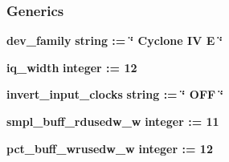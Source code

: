 \subsubsection*{Generics}
 \begin{DoxyCompactItemize}
\item 
{\bf dev\+\_\+family} {\bfseries {\bfseries \textcolor{comment}{string}\textcolor{vhdlchar}{ }\textcolor{vhdlchar}{ }\textcolor{vhdlchar}{\+:}\textcolor{vhdlchar}{=}\textcolor{vhdlchar}{ }\textcolor{vhdlchar}{ }\textcolor{vhdlchar}{ }\textcolor{vhdlchar}{ }\textcolor{keyword}{\char`\"{} Cyclone I\+V E \char`\"{}}\textcolor{vhdlchar}{ }}}
\item 
{\bf iq\+\_\+width} {\bfseries {\bfseries \textcolor{comment}{integer}\textcolor{vhdlchar}{ }\textcolor{vhdlchar}{ }\textcolor{vhdlchar}{\+:}\textcolor{vhdlchar}{=}\textcolor{vhdlchar}{ }\textcolor{vhdlchar}{ } \textcolor{vhdldigit}{12} \textcolor{vhdlchar}{ }}}
\item 
{\bf invert\+\_\+input\+\_\+clocks} {\bfseries {\bfseries \textcolor{comment}{string}\textcolor{vhdlchar}{ }\textcolor{vhdlchar}{ }\textcolor{vhdlchar}{\+:}\textcolor{vhdlchar}{=}\textcolor{vhdlchar}{ }\textcolor{vhdlchar}{ }\textcolor{vhdlchar}{ }\textcolor{vhdlchar}{ }\textcolor{keyword}{\char`\"{} O\+F\+F \char`\"{}}\textcolor{vhdlchar}{ }}}
\item 
{\bf smpl\+\_\+buff\+\_\+rdusedw\+\_\+w} {\bfseries {\bfseries \textcolor{comment}{integer}\textcolor{vhdlchar}{ }\textcolor{vhdlchar}{ }\textcolor{vhdlchar}{\+:}\textcolor{vhdlchar}{=}\textcolor{vhdlchar}{ }\textcolor{vhdlchar}{ } \textcolor{vhdldigit}{11} \textcolor{vhdlchar}{ }}}
\item 
{\bf pct\+\_\+buff\+\_\+wrusedw\+\_\+w} {\bfseries {\bfseries \textcolor{comment}{integer}\textcolor{vhdlchar}{ }\textcolor{vhdlchar}{ }\textcolor{vhdlchar}{\+:}\textcolor{vhdlchar}{=}\textcolor{vhdlchar}{ }\textcolor{vhdlchar}{ } \textcolor{vhdldigit}{12} \textcolor{vhdlchar}{ }}}
\end{DoxyCompactItemize}
